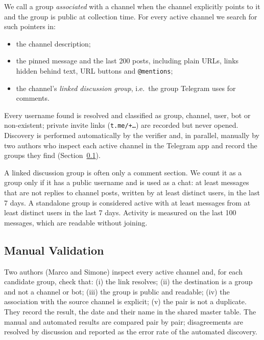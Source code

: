 We call a group \emph{associated} with a channel when the channel explicitly
points to it and the group is public at collection time.
For every active channel we search for such pointers in:
\begin{itemize}
  \item the channel description;
  \item the pinned message and the last 200 posts, including plain URLs, links
        hidden behind text, URL buttons and \texttt{@mentions};
  \item the channel's \emph{linked discussion group}, i.e.\ the group Telegram
        uses for comments.
\end{itemize}
Every username found is resolved and classified as group, channel, user, bot or
non-existent; private invite links (\texttt{t.me/+\ldots}) are recorded but never
opened. Discovery is performed automatically by the verifier and, in parallel,
manually by two authors who inspect each active channel in the Telegram app and
record the groups they find (Section~\ref{subsec:manual-validation}).

A linked discussion group is often only a comment section. We count it as a
group only if it has a public username and is used as a chat: at least
 messages that are not replies to channel posts, written by at least
 distinct users, in the last 7 days. A standalone group is considered
active with at least  messages from at least  distinct users in
the last 7 days. Activity is measured on the last 100 messages, which are
readable without joining.

\subsection{Manual Validation}
\label{subsec:manual-validation}

Two authors (Marco and Simone) inspect every active channel and, for each
candidate group, check that:
(i) the link resolves;
(ii) the destination is a group and not a channel or bot;
(iii) the group is public and readable;
(iv) the association with the source channel is explicit;
(v) the pair is not a duplicate.
They record the result, the date and their name in the shared master table.
The manual and automated results are compared pair by pair; disagreements are
resolved by discussion and reported as the error rate of the automated
discovery. 

